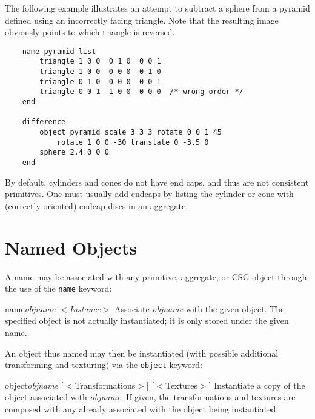 The following example illustrates an attempt to subtract a sphere from
a pyramid defined using an incorrectly facing triangle.  Note
that the resulting image obviously points to which triangle is
reversed.

\begin{verbatim}
    name pyramid list
        triangle 1 0 0  0 1 0  0 0 1
        triangle 1 0 0  0 0 0  0 1 0
        triangle 0 1 0  0 0 0  0 0 1
        triangle 0 0 1  1 0 0  0 0 0  /* wrong order */
    end

    difference
        object pyramid scale 3 3 3 rotate 0 0 1 45
            rotate 1 0 0 -30 translate 0 -3.5 0
        sphere 2.4 0 0 0
    end
\end{verbatim}

By default, cylinders and cones do not have end caps, and thus
are not consistent primitives.  One must usually
add endcaps by listing the
cylinder or cone with (correctly-oriented) endcap discs in an aggregate.

\section {Named Objects}

A name may be associated with any primitive, aggregate, or CSG
object through the use of the {\tt name}
keyword:

\begin{defkey}{name}{{\em objname} $<${\em Instance\/}$>$}
	Associate {\em objname} with the given object.  The
	specified object is not actually instantiated; it
	is only stored under the given name.
\end{defkey}

An object thus named may then be instantiated (with possible
additional transforming and texturing) via the {\tt object} keyword:

\begin{defkey}{object}{{\em objname} [$<$Transformations$>$] [$<$Textures$>$]}
	Instantiate a copy of the object associated with {\em objname}.
	If given, the transformations and textures are composed
	with any already associated with
	the object being instantiated.
\end{defkey}
